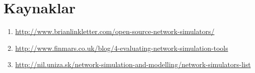 \section{Kaynaklar}

\begin{enumerate}
\item \url{http://www.brianlinkletter.com/open-source-network-simulators/}
\item \url{http://www.finmars.co.uk/blog/4-evaluating-network-simulation-tools}
\item \url{http://nil.uniza.sk/network-simulation-and-modelling/network-simulators-list}

\bigskip
\end{enumerate}